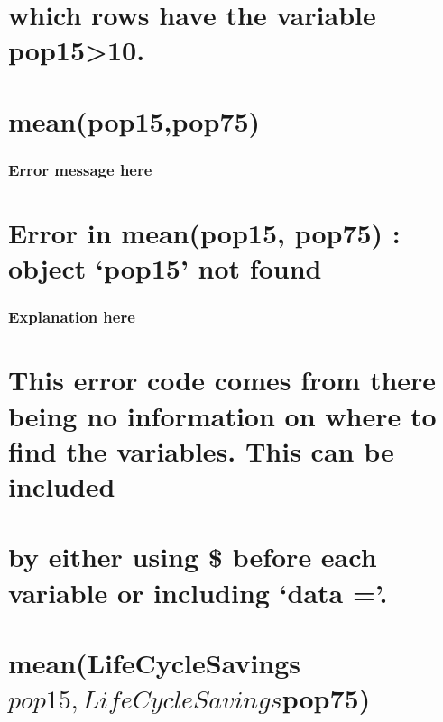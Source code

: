 \documentclass[]{article}
\begin{document}
\section{which rows have the variable
pop15\textgreater{}10.}\label{which-rows-have-the-variable-pop1510.}

\section{mean(pop15,pop75)}\label{meanpop15pop75}

\subsubsection{Error message here}\label{error-message-here-1}

\section{\texorpdfstring{Error in mean(pop15, pop75) : object `pop15'
not
found}{Error in mean(pop15, pop75) : object pop15 not found}}\label{error-in-meanpop15-pop75-object-pop15-not-found}

\subsubsection{Explanation here}\label{explanation-here-1}

\section{This error code comes from there being no information on where
to find the variables. This can be
included}\label{this-error-code-comes-from-there-being-no-information-on-where-to-find-the-variables.-this-can-be-included}

\section{\texorpdfstring{by either using \$ before each variable or
including `data
='.}{by either using \$ before each variable or including data =.}}\label{by-either-using-before-each-variable-or-including-data-.}

\section{\texorpdfstring{mean(LifeCycleSavings\(pop15, LifeCycleSavings\)pop75)}{mean(LifeCycleSavingspop15, LifeCycleSavingspop75)}}\label{meanlifecyclesavingspop15-lifecyclesavingspop75}
\end{document}
